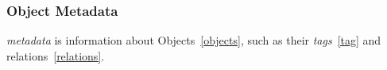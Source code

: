 \subsubsection{Object Metadata}
\label{metadata}

\emph{metadata} is information about Objects~\ref{objects}, such as their \emph{tags}~\ref{tag} and relations~\ref{relations}. 
